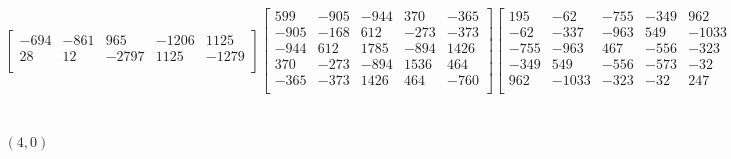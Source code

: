 \documentclass[12pt]{amsart}
\theoremstyle{plain}
\theoremstyle{definition}
\begin{document}
\begin{landscape}
\begin{align*}
\begin{bmatrix}
 -694  &   -861  &   965  &   -1206  &   1125  \\ 
 28  &   12  &   -2797  &   1125  &   -1279  \\ 
\end{bmatrix}
\begin{bmatrix}
599  &   -905  &   -944  &   370  &   -365  \\ 
 -905  &   -168  &   612  &   -273  &   -373  \\ 
 -944  &   612  &   1785  &   -894  &   1426  \\ 
 370  &   -273  &   -894  &   1536  &   464  \\ 
 -365  &   -373  &   1426  &   464  &   -760  \\ 
\end{bmatrix}
\begin{bmatrix}
195  &   -62  &   -755  &   -349  &   962  \\ 
 -62  &   -337  &   -963  &   549  &   -1033  \\ 
 -755  &   -963  &   467  &   -556  &   -323  \\ 
 -349  &   549  &   -556  &   -573  &   -32  \\ 
 962  &   -1033  &   -323  &   -32  &   247  \\ 
\end{bmatrix}
\begin{bmatrix}
1  &   0  &   0  &   0  &   0  \\ 
 0  &   1  &   0  &   0  &   0  \\ 
 0  &   0  &   1  &   0  &   0  \\ 
 0  &   0  &   0  &   1  &   0  \\ 
 0  &   0  &   0  &   0  &   1  \\ 
\end{bmatrix}
\\
(4,0) &:
\begin{bmatrix}
1206  &   -258  &   -198  &   1068  &   126  \\ 
 -258  &   557  &   -1820  &   -1297  &   42  \\ 
 -198  &   -1820  &   1638  &   1244  &   851  \\ 
 1068  &   -1297  &   1244  &   561  &   444  \\ 
 126  &   42  &   851  &   444  &   -1551  \\ 
\end{bmatrix}
\begin{bmatrix}
-178  &   421  &   -13  &   883  &   -464  \\ 
 421  &   -1359  &   2074  &   2909  &   -334  \\ 

\end{bmatrix}
\end{align*}
\end{landscape}
\end{document}
